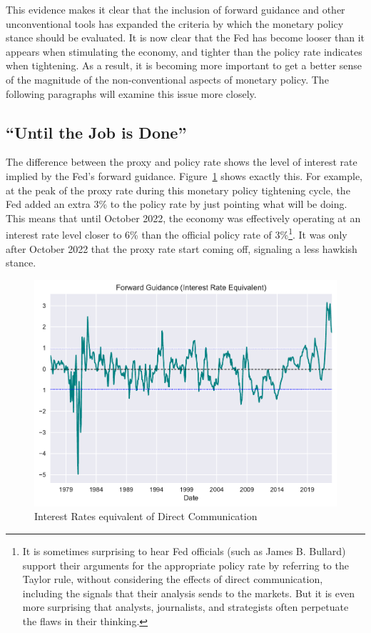 \documentclass[
  letterpaper,
  DIV=11,
  numbers=noendperiod]{scrartcl}
\begin{document}
This evidence makes it clear that the inclusion of forward guidance and
other unconventional tools has expanded the criteria by which the
monetary policy stance should be evaluated. It is now clear that the Fed
has become looser than it appears when stimulating the economy, and
tighter than the policy rate indicates when tightening. As a result, it
is becoming more important to get a better sense of the magnitude of the
non-conventional aspects of monetary policy. The following paragraphs
will examine this issue more closely.

\hypertarget{until-the-job-is-done}{%
\subsection{``Until the Job is Done''}\label{until-the-job-is-done}}

The difference between the proxy and policy rate shows the level of
interest rate implied by the Fed's forward guidance. Figure~\ref{fig-2}
shows exactly this. For example, at the peak of the proxy rate during
this monetary policy tightening cycle, the Fed added an extra 3\% to the
policy rate by just pointing what will be doing. This means that until
October 2022, the economy was effectively operating at an interest rate
level closer to 6\% than the official policy rate of 3\%\footnote{It is
  sometimes surprising to hear Fed officials (such as James B. Bullard)
  support their arguments for the appropriate policy rate by referring
  to the Taylor rule, without considering the effects of direct
  communication, including the signals that their analysis sends to the
  markets. But it is even more surprising that analysts, journalists,
  and strategists often perpetuate the flaws in their thinking.}. It was
only after October 2022 that the proxy rate start coming off, signaling
a less hawkish stance.

\begin{figure}

{\centering \includegraphics{Hawkish_Fed_files/figure-pdf/fig-2-output-1.pdf}

}

\caption{\label{fig-2}Interest Rates equivalent of Direct Communication}

\end{figure}
\end{document}
